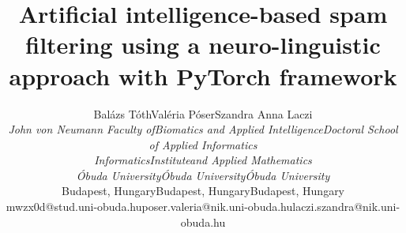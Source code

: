 \documentclass[lettersize,journal]{IEEEtran}
\begin{document}
\title{Artificial intelligence-based spam filtering using a neuro-linguistic approach with PyTorch framework}


\author{%
  \setlength{\tabcolsep}{2em}
  \begin{tabular}{@{}ccc@{}}
      \small{Balázs Tóth} & \small{Valéria Póser} & \small{Szandra Anna Laczi} \\[0ex]
      \small{\it John von Neumann Faculty of} & \small{\it Biomatics and Applied Intelligence} & \small{\it Doctoral School of Applied Informatics} \\[0ex]
      \small{\it Informatics} & \small{\it Institute} & \small{\it and Applied Mathematics} \\[0ex]
      \small{\it Óbuda University} & \small{\it Óbuda University} & \small{\it Óbuda University} \\[0ex]
      \small{Budapest, Hungary}  & \small{Budapest, Hungary} & \small{Budapest, Hungary} \\[0ex]
      \small{mwzx0d@stud.uni-obuda.hu}  & \small{poser.valeria@nik.uni-obuda.hu} & \small{laczi.szandra@nik.uni-obuda.hu}
  \end{tabular}
}

\maketitle



% 




% 

\end{document}
